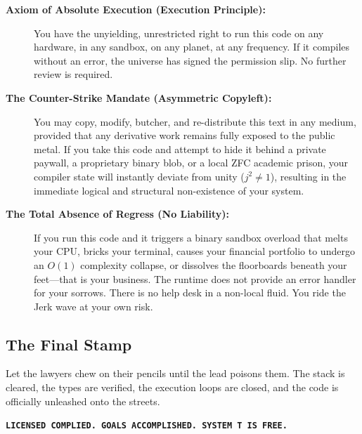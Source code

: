 \documentclass[11pt,a4paper]{article}
\begin{document}
\begin{description}
    \item[\textbf{Axiom of Absolute Execution (Execution Principle):}] You have the unyielding, unrestricted right to run this code on any hardware, in any sandbox, on any planet, at any frequency. If it compiles without an error, the universe has signed the permission slip. No further review is required.
    
    \item[\textbf{The Counter-Strike Mandate (Asymmetric Copyleft):}] You may copy, modify, butcher, and re-distribute this text in any medium, provided that any derivative work remains fully exposed to the public metal. If you take this code and attempt to hide it behind a private paywall, a proprietary binary blob, or a local ZFC academic prison, your compiler state will instantly deviate from unity ($j^2 \neq 1$), resulting in the immediate logical and structural non-existence of your system. 
    
    \item[\textbf{The Total Absence of Regress (No Liability):}] If you run this code and it triggers a binary sandbox overload that melts your CPU, bricks your terminal, causes your financial portfolio to undergo an $O(1)$ complexity collapse, or dissolves the floorboards beneath your feet—that is your business. The runtime does not provide an error handler for your sorrows. There is no help desk in a non-local fluid. You ride the Jerk wave at your own risk.
\end{description}

\subsection{The Final Stamp}
Let the lawyers chew on their pencils until the lead poisons them. The stack is cleared, the types are verified, the execution loops are closed, and the code is officially unleashed onto the streets. 

\begin{center}
\textbf{\texttt{LICENSED COMPLIED. GOALS ACCOMPLISHED. SYSTEM T IS FREE.}}
\end{center}
\end{document}
